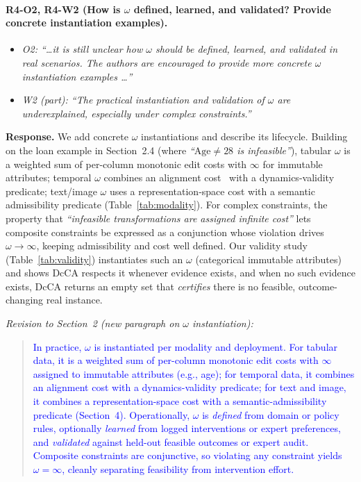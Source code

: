 \paragraph{R4-O2, R4-W2 (How is $\omega$ defined, learned, and validated? Provide concrete instantiation examples).}

\begin{itemize}[leftmargin=1.2em, itemsep=1pt, topsep=2pt]
\item \textit{O2: ``\dots it is still unclear how $\omega$ should be defined, learned, and validated in real scenarios. The authors are encouraged to provide more concrete $\omega$ instantiation examples \dots''}
\item \textit{W2 (part): ``The practical instantiation and validation of $\omega$ are underexplained, especially under complex constraints.''}
\end{itemize}
\smallskip

\noindent\textbf{Response.}
We add concrete $\omega$ instantiations and describe its lifecycle. Building on the loan example in Section~2.4 (where \emph{``$\text{Age}\neq 28$ is infeasible''}), tabular $\omega$ is a weighted sum of per-column monotonic edit costs with $\infty$ for immutable attributes; temporal $\omega$ combines an alignment cost~\cite{senin2008dynamic} with a dynamics-validity predicate; text/image $\omega$ uses a representation-space cost with a semantic admissibility predicate (Table~\ref{tab:modality}). For complex constraints, the property that \emph{``infeasible transformations are assigned infinite cost''} lets composite constraints be expressed as a conjunction whose violation drives $\omega\to\infty$, keeping admissibility and cost well defined. Our validity study (Table~\ref{tab:validity}) instantiates such an $\omega$ (categorical immutable attributes) and shows DcCA respects it whenever evidence exists, and when no such evidence exists, DcCA returns an empty set that \emph{certifies} there is no feasible, outcome-changing real instance.

\noindent\emph{Revision to Section~2 (new paragraph on $\omega$ instantiation):}
\begin{quote}
\textcolor{blue}{In practice, $\omega$ is instantiated per modality and deployment. For tabular data, it is a weighted sum of per-column monotonic edit costs with $\infty$ assigned to immutable attributes (e.g., age); for temporal data, it combines an alignment cost with a dynamics-validity predicate; for text and image, it combines a representation-space cost with a semantic-admissibility predicate (Section~4). Operationally, $\omega$ is \emph{defined} from domain or policy rules, optionally \emph{learned} from logged interventions or expert preferences, and \emph{validated} against held-out feasible outcomes or expert audit. Composite constraints are conjunctive, so violating any constraint yields $\omega=\infty$, cleanly separating feasibility from intervention effort.}
\end{quote}
